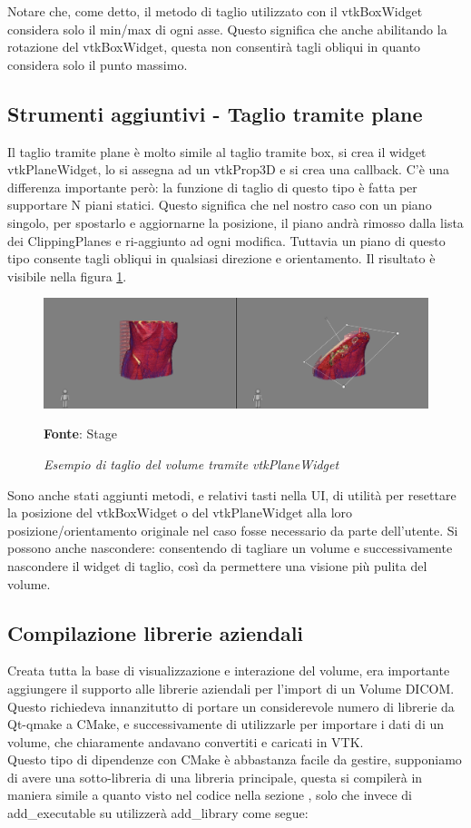 Notare che, come detto, il metodo di taglio utilizzato con il vtkBoxWidget considera solo il min/max di ogni asse. Questo significa che anche abilitando la rotazione del vtkBoxWidget, questa non consentirà tagli obliqui in quanto considera solo il punto massimo. 

\subsection{Strumenti aggiuntivi - Taglio tramite plane}
Il taglio tramite plane è molto simile al taglio tramite box, si crea il widget vtkPlaneWidget, lo si assegna ad un vtkProp3D e si crea una callback. C'è una differenza importante però: la funzione di taglio di questo tipo è fatta per supportare N piani statici. Questo significa che nel nostro caso con un piano singolo, per spostarlo e aggiornarne la posizione, il piano andrà rimosso dalla lista dei ClippingPlanes e ri-aggiunto ad ogni modifica. Tuttavia un piano di questo tipo consente tagli obliqui in qualsiasi direzione e orientamento. Il risultato è visibile nella figura \ref{fig: Taglio Plane}.

\begin{figure}[h]
    \centering
    \includegraphics[width=1\textwidth]{immagini/svolgimento/planecrop.png}
    \caption{\textit{Esempio di taglio del volume tramite vtkPlaneWidget}}
    \textbf{Fonte}: Stage
    \label{fig: Taglio Plane}
\end{figure}

Sono anche stati aggiunti metodi, e relativi tasti nella UI, di utilità per resettare la posizione del vtkBoxWidget o del vtkPlaneWidget alla loro posizione/orientamento originale nel caso fosse necessario da parte dell'utente. Si possono anche nascondere: consentendo di tagliare un volume e successivamente nascondere il widget di taglio, così da permettere una visione più pulita del volume.

\subsection{Compilazione librerie aziendali}
Creata tutta la base di visualizzazione e interazione del volume, era importante aggiungere il supporto alle librerie aziendali per l'import di un Volume DICOM. Questo richiedeva innanzitutto di portare un considerevole numero di librerie da Qt-qmake a CMake, e successivamente di utilizzarle per importare i dati di un volume, che chiaramente andavano convertiti e caricati in VTK.
\\
Questo tipo di dipendenze con CMake è abbastanza facile da gestire, supponiamo di avere una sotto-libreria di una libreria principale, questa si compilerà in maniera simile a quanto visto nel codice nella sezione , solo che invece di add\_executable su utilizzerà add\_library come segue:

